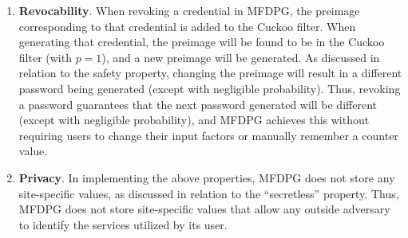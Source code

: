 \begin{enumerate}[leftmargin=*]
    \item \textbf{Revocability}. When revoking a credential in MFDPG, the preimage corresponding to that credential is added to the Cuckoo filter. When generating that credential, the preimage will be found to be in the Cuckoo filter (with $p=1$), and a new preimage will be generated. As discussed in relation to the safety property, changing the preimage will result in a different password being generated (except with negligible probability).    
    Thus, revoking a password guarantees that the next password generated will be different (except with negligible probability), and MFDPG achieves this without requiring users to change their input factors or manually remember a counter value.
    
    \item \textbf{Privacy}. In implementing the above properties, MFDPG does not store any site-specific values, as discussed in relation to the ``secretless'' property. Thus, MFDPG does not store site-specific values that allow any outside adversary to identify the services utilized by its user.
\end{enumerate}